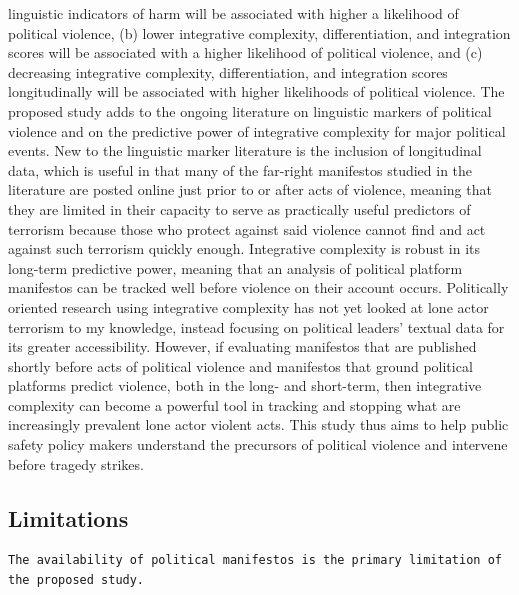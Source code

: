 \documentclass[
  english,
  man]{apa6}
\begin{document}
linguistic indicators of harm will be associated with higher a likelihood of political
violence, (b) lower integrative complexity, differentiation, and integration scores will be
associated with a higher likelihood of political violence, and (c) decreasing integrative
complexity, differentiation, and integration scores longitudinally will be associated with
higher likelihoods of political violence. The proposed study adds to the ongoing literature
on linguistic markers of political violence and on the predictive power of integrative
complexity for major political events. New to the linguistic marker literature is the
inclusion of longitudinal data, which is useful in that many of the far-right manifestos
studied in the literature are posted online just prior to or after acts of violence, meaning
that they are limited in their capacity to serve as practically useful predictors of
terrorism because those who protect against said violence cannot find and act against such
terrorism quickly enough. Integrative complexity is robust in its long-term predictive
power, meaning that an analysis of political platform manifestos can be tracked well before
violence on their account occurs. Politically oriented research using integrative complexity
has not yet looked at lone actor terrorism to my knowledge, instead focusing on political
leaders' textual data for its greater accessibility. However, if evaluating manifestos that
are published shortly before acts of political violence and manifestos that ground political
platforms predict violence, both in the long- and short-term, then integrative complexity
can become a powerful tool in tracking and stopping what are increasingly prevalent lone
actor violent acts. This study thus aims to help public safety policy makers understand the
precursors of political violence and intervene before tragedy strikes.

\subsection{Limitations}\label{limitations}

\begin{verbatim}
The availability of political manifestos is the primary limitation of the proposed study. 
\end{verbatim}
\end{document}
